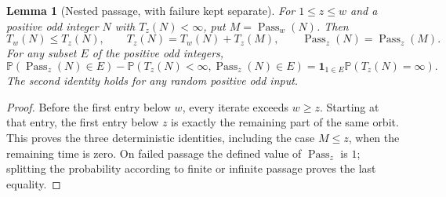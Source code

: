 \documentclass[11pt]{article}
\newtheorem{lemma}[proposition]{Lemma}
\theoremstyle{remark}\newtheorem{remark}[proposition]{Remark}
\newcommand{\PP}{\mathbb P}
\newcommand{\one}{\mathbf 1}
\begin{document}
\begin{lemma}[Nested passage, with failure kept separate]
\label{lem:nested-passage}
For $1\le z\le w$ and a positive odd integer $N$ with $T_z(N)<\infty$,
put $M=\operatorname{Pass}_w(N)$. Then
\[
 T_w(N)\le T_z(N),\qquad
 T_z(N)=T_w(N)+T_z(M),\qquad
 \operatorname{Pass}_z(N)=\operatorname{Pass}_z(M).
\]
For any subset $E$ of the positive odd integers,
\[
 \PP(\operatorname{Pass}_z(N)\in E)
 -\PP(T_z(N)<\infty,\operatorname{Pass}_z(N)\in E)
 =\one_{1\in E}\PP(T_z(N)=\infty).
\]
The second identity holds for any random positive odd input.
\end{lemma}
\begin{proof}
Before the first entry below $w$, every iterate exceeds $w\ge z$.
Starting at that entry, the first entry below $z$ is exactly the
remaining part of the same orbit. This proves the three deterministic
identities, including the case $M\le z$, when the remaining time is zero.
On failed passage the defined value of $\operatorname{Pass}_z$ is $1$;
splitting the probability according to finite or infinite passage proves
the last equality.
\end{proof}
\end{document}
